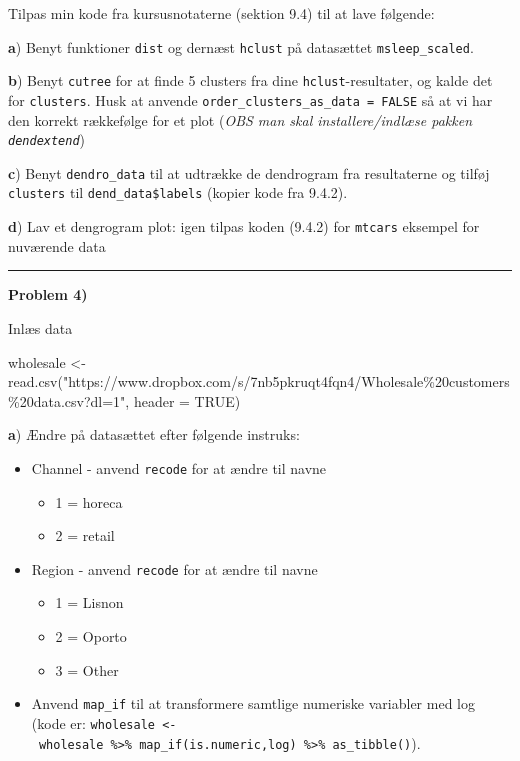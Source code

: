 \documentclass[
]{book}
\newenvironment{Shaded}{\begin{snugshade}}{\end{snugshade}}
\newcommand{\AttributeTok}[1]{\textcolor[rgb]{0.77,0.63,0.00}{#1}}
\newcommand{\ConstantTok}[1]{\textcolor[rgb]{0.00,0.00,0.00}{#1}}
\newcommand{\FunctionTok}[1]{\textcolor[rgb]{0.00,0.00,0.00}{#1}}
\newcommand{\NormalTok}[1]{#1}
\newcommand{\OtherTok}[1]{\textcolor[rgb]{0.56,0.35,0.01}{#1}}
\newcommand{\StringTok}[1]{\textcolor[rgb]{0.31,0.60,0.02}{#1}}
\providecommand{\tightlist}{%
  \setlength{\itemsep}{0pt}\setlength{\parskip}{0pt}}
\begin{document}
Tilpas min kode fra kursusnotaterne (sektion 9.4) til at lave følgende:

\textbf{a}) Benyt funktioner \texttt{dist} og dernæst \texttt{hclust} på datasættet \texttt{msleep\_scaled}.

\textbf{b}) Benyt \texttt{cutree} for at finde 5 clusters fra dine \texttt{hclust}-resultater, og kalde det for \texttt{clusters}. Husk at anvende \texttt{order\_clusters\_as\_data\ =\ FALSE} så at vi har den korrekt rækkefølge for et plot (\emph{OBS man skal installere/indlæse pakken \texttt{dendextend}})

\textbf{c}) Benyt \texttt{dendro\_data} til at udtrække de dendrogram fra resultaterne og tilføj \texttt{clusters} til \texttt{dend\_data\$labels} (kopier kode fra 9.4.2).

\textbf{d}) Lav et dengrogram plot: igen tilpas koden (9.4.2) for \texttt{mtcars} eksempel for nuværende data

\begin{center}\rule{0.5\linewidth}{0.5pt}\end{center}

\textbf{Problem 4)}

Inlæs data

\begin{Shaded}
\begin{Highlighting}[]
\NormalTok{wholesale }\OtherTok{\textless{}{-}} \FunctionTok{read.csv}\NormalTok{(}\StringTok{"https://www.dropbox.com/s/7nb5pkruqt4fqn4/Wholesale\%20customers\%20data.csv?dl=1"}\NormalTok{, }\AttributeTok{header =} \ConstantTok{TRUE}\NormalTok{)}
\end{Highlighting}
\end{Shaded}

\textbf{a}) Ændre på datasættet efter følgende instruks:

\begin{itemize}
\tightlist
\item
  Channel - anvend \texttt{recode} for at ændre til navne

  \begin{itemize}
  \tightlist
  \item
    1 = horeca
  \item
    2 = retail
  \end{itemize}
\item
  Region - anvend \texttt{recode} for at ændre til navne

  \begin{itemize}
  \tightlist
  \item
    1 = Lisnon
  \item
    2 = Oporto
  \item
    3 = Other
  \end{itemize}
\item
  Anvend \texttt{map\_if} til at transformere samtlige numeriske variabler med log (kode er: \texttt{wholesale\ \textless{}-\ wholesale\ \%\textgreater{}\%\ map\_if(is.numeric,log)\ \%\textgreater{}\%\ as\_tibble()}).
\end{itemize}
\end{document}

